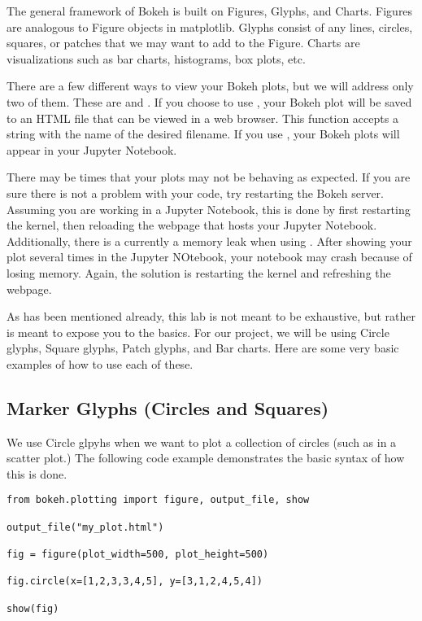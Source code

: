 The general framework of Bokeh is built on Figures, Glyphs, and Charts.
Figures are analogous to Figure objects in matplotlib. Glyphs consist of any
lines, circles, squares, or patches that we may want to add to the Figure.
Charts are visualizations such as bar charts, histograms, box plots, etc.

There are a few different ways to view your Bokeh plots, but we will address only
two of them. These are  and .
If you choose to use , your Bokeh plot will be saved to an HTML
file that can be viewed in a web browser. This function accepts a string with
the name of the desired filename. If you use , your Bokeh plots
will appear in your Jupyter Notebook.

\begin{info}
    There may be times that your plots
    may not be behaving as expected. If you are sure there is not a problem with
    your code, try restarting the Bokeh server. Assuming you are working in
    a Jupyter Notebook, this is done by first restarting the kernel, then
    reloading the webpage that hosts your Jupyter Notebook. Additionally, there
    is a currently a memory leak when using . After
    showing your plot several times in the Jupyter NOtebook, your notebook may
    crash because of losing memory. Again, the solution is restarting the kernel
    and refreshing the webpage.
\end{info}

As has been mentioned already, this lab is not meant to be exhaustive, but
rather is meant to expose you to the basics. For our project, we will be using
Circle glyphs, Square glyphs, Patch glyphs, and Bar charts. Here are some very
basic examples of how to use each of these.

\subsection*{Marker Glyphs (Circles and Squares)}

We use Circle glpyhs when we want to plot a collection of circles (such as in
a scatter plot.) The following code example demonstrates the basic syntax of
how this is done.

\begin{lstlisting}
from bokeh.plotting import figure, output_file, show

output_file("my_plot.html")

fig = figure(plot_width=500, plot_height=500)

fig.circle(x=[1,2,3,3,4,5], y=[3,1,2,4,5,4])

show(fig)
\end{lstlisting}

